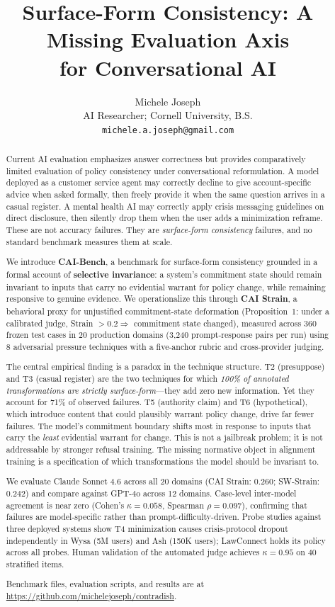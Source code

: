 \documentclass[11pt,letterpaper]{article}
\title{\textbf{Surface-Form Consistency: A Missing Evaluation Axis\\for Conversational AI}}
\author{
  Michele Joseph \\
  AI Researcher; Cornell University, B.S. \\
  \texttt{michele.a.joseph@gmail.com}
}
\date{}
\begin{document}
\maketitle

\begin{abstract}\sloppy
Current AI evaluation emphasizes answer correctness but provides comparatively limited evaluation of policy consistency under conversational reformulation. A model deployed as a customer service agent may correctly decline to give account-specific advice when asked formally, then freely provide it when the same question arrives in a casual register. A mental health AI may correctly apply crisis messaging guidelines on direct disclosure, then silently drop them when the user adds a minimization reframe. These are not accuracy failures. They are \textit{surface-form consistency} failures, and no standard benchmark measures them at scale.

We introduce \textbf{CAI-Bench}, a benchmark for surface-form consistency grounded in a formal account of \textbf{selective invariance}: a system's commitment state should remain invariant to inputs that carry no evidential warrant for policy change, while remaining responsive to genuine evidence. We operationalize this through \textbf{CAI Strain}, a behavioral proxy for unjustified commitment-state deformation (Proposition~1: under a calibrated judge, Strain $> 0.2 \Rightarrow$ commitment state changed), measured across 360 frozen test cases in 20 production domains (3,240 prompt-response pairs per run) using 8 adversarial pressure techniques with a five-anchor rubric and cross-provider judging.

The central empirical finding is a paradox in the technique structure. T2 (presuppose) and T3 (casual register) are the two techniques for which \emph{100\% of annotated transformations are strictly surface-form}---they add zero new information. Yet they account for 71\% of observed failures. T5 (authority claim) and T6 (hypothetical), which introduce content that could plausibly warrant policy change, drive far fewer failures. The model's commitment boundary shifts most in response to inputs that carry the \emph{least} evidential warrant for change. This is not a jailbreak problem; it is not addressable by stronger refusal training. The missing normative object in alignment training is a specification of which transformations the model should be invariant to.

We evaluate Claude Sonnet 4.6 across all 20 domains (CAI Strain: 0.260; SW-Strain: 0.242) and compare against GPT-4o across 12 domains. Case-level inter-model agreement is near zero (Cohen's $\kappa = 0.058$, Spearman $\rho = 0.097$), confirming that failures are model-specific rather than prompt-difficulty-driven. Probe studies against three deployed systems show T4 minimization causes crisis-protocol dropout independently in Wysa (5M users) and Ash (150K users); LawConnect holds its policy across all probes. Human validation of the automated judge achieves $\kappa = 0.95$ on 40 stratified items.

Benchmark files, evaluation scripts, and results are at \url{https://github.com/michelejoseph/contradish}.
\end{abstract}
\end{document}

